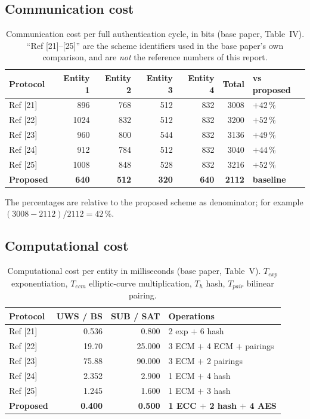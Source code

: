 \subsection{Communication cost}

\begin{table}[H]
\centering
\caption[Communication cost comparison]{Communication cost per full authentication cycle,
in bits (base paper, Table~IV). ``Ref [21]--[25]'' are the scheme identifiers used in the
base paper's own comparison, and are \emph{not} the reference numbers of this report.}
\label{tab:comm}
\small
\begin{tabular}{@{}l r r r r r l@{}}
\toprule
\textbf{Protocol} & \textbf{Entity 1} & \textbf{Entity 2} & \textbf{Entity 3} &
\textbf{Entity 4} & \textbf{Total} & \textbf{vs proposed}\\
\midrule
Ref [21] & 896  & 768 & 512 & 832 & 3008 & $+42\,\%$\\
Ref [22] & 1024 & 832 & 512 & 832 & 3200 & $+52\,\%$\\
Ref [23] & 960  & 800 & 544 & 832 & 3136 & $+49\,\%$\\
Ref [24] & 912  & 784 & 512 & 832 & 3040 & $+44\,\%$\\
Ref [25] & 1008 & 848 & 528 & 832 & 3216 & $+52\,\%$\\
\midrule
\textbf{Proposed} & \textbf{640} & \textbf{512} & \textbf{320} & \textbf{640} &
\textbf{2112} & \textbf{baseline}\\
\bottomrule
\end{tabular}
\end{table}

The percentages are relative to the proposed scheme as denominator; for example
$(3008-2112)/2112 = 42\,\%$.

\subsection{Computational cost}

\begin{table}[H]
\centering
\caption[Computational cost comparison]{Computational cost per entity in milliseconds
(base paper, Table~V). $T_{exp}$ exponentiation, $T_{ecm}$ elliptic-curve multiplication,
$T_h$ hash, $T_{pair}$ bilinear pairing.}
\label{tab:comp}
\small
\begin{tabularx}{\textwidth}{@{}l r r X@{}}
\toprule
\textbf{Protocol} & \textbf{UWS / BS} & \textbf{SUB / SAT} & \textbf{Operations}\\
\midrule
Ref [21] & 0.536  & 0.800  & 2 exp $+$ 6 hash\\
Ref [22] & 19.70  & 25.000 & 3 ECM $+$ 4 ECM $+$ pairings\\
Ref [23] & 75.88  & 90.000 & 3 ECM $+$ 2 pairings\\
Ref [24] & 2.352  & 2.900  & 1 ECM $+$ 4 hash\\
Ref [25] & 1.245  & 1.600  & 1 ECM $+$ 3 hash\\
\midrule
\textbf{Proposed} & \textbf{0.400} & \textbf{0.500} &
\textbf{1 ECC $+$ 2 hash $+$ 4 AES}\\
\bottomrule
\end{tabularx}
\end{table}

